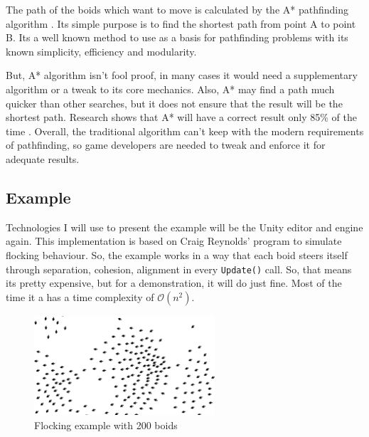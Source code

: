 \documentclass[a4paper, 12pt]{book}
\begin{document}
The path of the boids which want to move is calculated by the A* pathfinding algorithm \cite{AStarHart1968}. Its simple purpose is to find the shortest path from point A to point B. Its a well known method to use as a basis for pathfinding problems with its known simplicity, efficiency and modularity.

But, A* algorithm isn't fool proof, in many cases it would need a supplementary algorithm or a tweak to its core mechanics. Also, A* may find a path much quicker than other searches, but it does not ensure that the result will be the shortest path. Research shows that A* will have a correct result only 85\% of the time \cite{FOEAD2021507}. Overall, the traditional algorithm can't keep with the modern requirements of pathfinding, so game developers are needed to tweak and enforce it for adequate results.

\clearpage

\subsection{Example}

Technologies I will use to present the example will be the Unity \cite{UnitySoftware} editor and engine again. This implementation is based on Craig Reynolds' program \cite{FlocksReynolds} to simulate flocking behaviour. So, the example works in a way that each boid steers itself through separation, cohesion, alignment in every \texttt{Update()} call. So, that means its pretty expensive, but for a demonstration, it will do just fine. Most of the time it a has a time complexity of $ \mathcal{O}(n^2) $.

\begin{figure}[h]
\begin{center}
\includegraphics[width=0.6\textwidth]{Images/FlockingExample.png}
\end{center}
\caption{Flocking example with 200 boids}
\label{100boids}
\end{figure}
\end{document}
